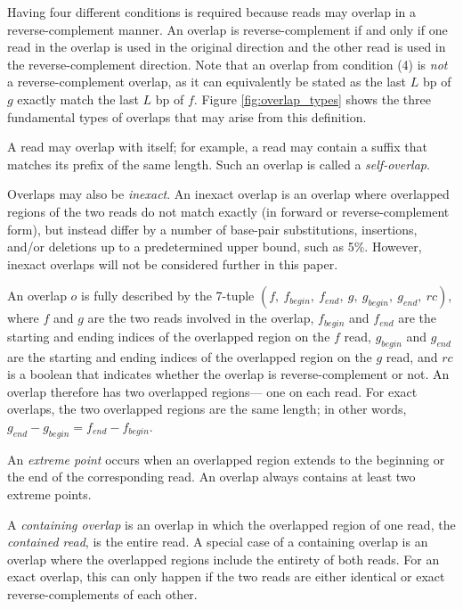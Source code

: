 \documentclass[10pt]{article}
\newcommand{\LengthVar}{L}
\newcommand{\Figure}[1]{Figure \ref{#1}}
\newcommand{\KeyTerm}[1]{{\it #1}}
\begin{document}
Having four different conditions is required because reads may overlap in a
reverse-complement manner.  An overlap is reverse-complement if and only if one
read in the overlap is used in the original direction and the other read is used
in the reverse-complement direction.  Note that an overlap from condition (4) is
{\em not} a reverse-complement overlap, as it can equivalently be stated as the
last $\LengthVar$ bp of $g$ exactly match the last $\LengthVar$ bp of $f$.
\Figure{fig:overlap_types} shows the three fundamental types of overlaps that
may arise from this definition.

A read may overlap with itself; for example, a read may contain a suffix that
matches its prefix of the same length.  Such an overlap is called a
\KeyTerm{self-overlap}.

Overlaps may also be \KeyTerm{inexact}.  An inexact overlap is an overlap where
overlapped regions of the two reads do not match exactly (in forward or
reverse-complement form), but instead differ by a number of base-pair
substitutions, insertions, and/or deletions up to a predetermined upper bound,
such as 5\%.  However, inexact overlaps will not be considered further in this
paper.

An overlap $o$ is fully described by the 7-tuple $(f,\ f_{begin},\ f_{end},\ g,
\ g_{begin},\ g_{end},\ rc)$, where $f$ and $g$ are the two reads involved in the
overlap, $f_{begin}$ and $f_{end}$ are the starting and ending indices of the
overlapped region on the $f$ read, $g_{begin}$ and $g_{end}$ are the starting
and ending indices of the overlapped region on the $g$ read, and $rc$ is a
boolean that indicates whether the overlap is reverse-complement or not.  An
overlap therefore has two overlapped regions--- one on each read.  For exact
overlaps, the two overlapped regions are the same length; in other words,
$g_{end} - g_{begin} = f_{end} - f_{begin}$.

An \KeyTerm{extreme point} occurs when an overlapped region extends to the
beginning or the end of the corresponding read.  An overlap always contains at
least two extreme points.

A \KeyTerm{containing overlap} is an overlap in which the overlapped region of
one read, the \KeyTerm{contained read}, is the entire read.  A special case of a
containing overlap is an overlap where the overlapped regions include the
entirety of both reads.  For an exact overlap, this can only happen if the two
reads are either identical or exact reverse-complements of each other.
\end{document}
